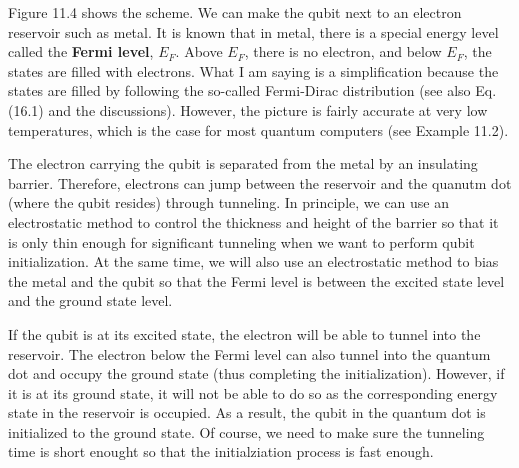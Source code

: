 \documentclass{article}
\begin{document}
Figure 11.4 shows the scheme. We can make the qubit next to an electron reservoir such as metal. It is known
that in metal, there is a special energy level called the \textbf{Fermi level}, $E_F$. Above $E_F$, there is no electron, and below $E_F$, the states
are filled with electrons. What I am saying is a simplification because the states are filled by 
following the so-called Fermi-Dirac distribution (see also Eq. (16.1) and the discussions). However, the picture
is fairly accurate at very low temperatures, which is the case for most quantum computers
(see Example 11.2).

The electron carrying the qubit is separated from the metal by an insulating barrier.
Therefore, electrons can jump between the reservoir and the quanutm dot (where the
qubit resides) through tunneling. In principle, we can use an electrostatic method to 
control the thickness and height of the barrier so that it is only thin enough for 
significant tunneling when we want to perform qubit initialization. At the same time,
we will also use an electrostatic method to bias the metal and the qubit so that the Fermi
level is between the excited state level and the ground state level.

If the qubit is at its excited state, the electron will be able to tunnel into the reservoir.
The electron below the Fermi level can also tunnel into the quantum dot and occupy the ground state
(thus completing the initialization). However, if it is at its ground state, it will not be able to do so 
as the corresponding energy state in the reservoir is occupied. As a result, the qubit in
the quantum dot is initialized to the ground state. Of course, we need to make sure the tunneling time is
short enought so that the initialziation process is fast enough.\\
\end{document}
